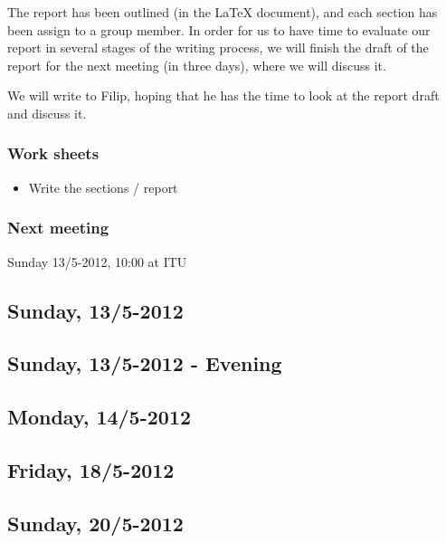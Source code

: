 \documentclass[a4paper,11pt]{article}
\begin{document}
The report has been outlined (in the LaTeX document), and each section has been assign to a group member. In order for us to have time to evaluate our report in several stages of the writing process, we will finish the draft of the report for the next meeting (in three days), where we will discuss it.

We will write to Filip, hoping that he has the time to look at the report draft and discuss it.

\subsubsection*{Work sheets}
\begin{itemize}
	\item Write the sections / report
\end{itemize}

\subsubsection*{Next meeting}
Sunday 13/5-2012, 10:00 at ITU

\pagebreak
\subsection{Sunday, 13/5-2012}


\pagebreak
\subsection{Sunday, 13/5-2012 - Evening}


\pagebreak
\subsection{Monday, 14/5-2012}


\pagebreak
\subsection{Friday, 18/5-2012}


\pagebreak
\subsection{Sunday, 20/5-2012}

\end{document}
